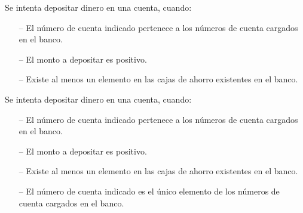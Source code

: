 \begin{tcolorbox}[colback=gray!5!white,colframe=gray!50!black,
  colbacktitle=gray!75!black,title=Depositar\_SP\_3]
  Se intenta depositar dinero en una cuenta, cuando:
     \begin{itemize}
        \item[--]{El número de cuenta indicado pertenece a los números de cuenta cargados en el banco.}
        \item[--]{El monto a depositar es positivo.}
        \item[--]{Existe al menos un elemento en las cajas de ahorro existentes en el banco.}
     \end{itemize}
\end{tcolorbox}



\begin{tcolorbox}[colback=gray!5!white,colframe=gray!50!black,
  colbacktitle=gray!75!black,title=Depositar\_SP\_4]
  Se intenta depositar dinero en una cuenta, cuando:
     \begin{itemize}
        \item[--]{El número de cuenta indicado pertenece a los números de cuenta cargados en el banco.}
        \item[--]{El monto a depositar es positivo.}
        \item[--]{Existe al menos un elemento en las cajas de ahorro existentes en el banco.}
        \item[--]{El número de cuenta indicado es el único elemento de los números de cuenta cargados en el banco.}
     \end{itemize}
\end{tcolorbox}




